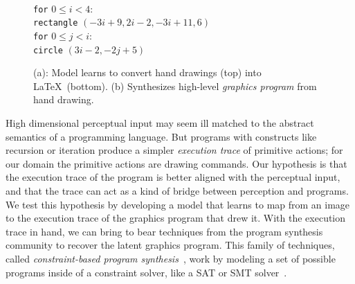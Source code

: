 \documentclass{article}
\newcommand{\remark}[1]{\textcolor{red}{[#1]}}
\begin{document}
\begin{figure}[h]
\begin{minipage}[t]{0.7\linewidth}
\begin{tabular}{llll}
\end{tabular}
\subcaption{}
  \end{minipage}%
  \begin{minipage}[t]{0.3\linewidth}
    \\
    \texttt{for} $0\leq i < 4$:\\
    \texttt{rectangle} $(-3i + 9,2i - 2, -3i + 11,6)$\\
    \texttt{for} $0\leq j < i$:\\
    \texttt{circle} $(3i-2,-2j+5)$\\
    \subcaption{}
  \end{minipage}
  \caption{(a): Model learns to convert hand drawings (top) into \LaTeX~(bottom). (b) Synthesizes high-level \emph{graphics program} from hand drawing.}\label{firstPageExamples}
  \end{figure}

High dimensional perceptual input may seem ill matched to the abstract
semantics of a programming language. But programs with constructs like
recursion or iteration produce a simpler \emph{execution trace} of
primitive actions; for our domain the primitive actions are drawing
commands. Our hypothesis is that the execution trace of the program is
better aligned with the perceptual input, and that the trace can act
as a kind of bridge between perception and programs. We test this
hypothesis by developing a model that learns to map from an image to
the execution trace of the graphics program that drew it.  With the
execution trace in hand, we can bring to bear techniques from the
program synthesis community to recover the latent graphics program.
This family of techniques, called \emph{constraint-based program synthesis}~\cite{solar2008program},
work by modeling a set of possible programs inside of a constraint solver,
like a SAT or SMT solver~\cite{de2008z3}.

\end{document}
